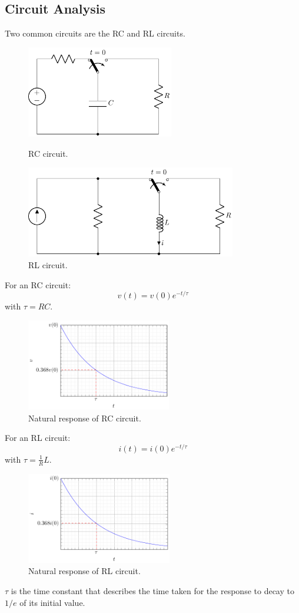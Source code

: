 \documentclass{article}
\begin{document}
\subsection{Circuit Analysis}
Two common circuits are the RC and RL circuits.
\begin{figure}[H]
    \centering
    \includegraphics[height = 4cm]{figures/rc_natural.pdf}
    \caption{RC circuit.} %
    \includegraphics[height = 4cm]{figures/rl_natural.pdf}
    \caption{RL circuit.} %
\end{figure}
For an RC circuit:
\begin{equation*}
    v\left( t \right) = v\left( 0 \right) e^{-t/\tau}
\end{equation*}
with \(\tau = RC\).
\begin{figure}[H]
    \centering
    \includegraphics[height = 4cm]{figures/rc_natural_plot.pdf}
    \caption{Natural response of RC circuit.} %
\end{figure}
For an RL circuit:
\begin{equation*}
    i\left( t \right) = i\left( 0 \right) e^{-t/\tau}
\end{equation*}
with \(\tau = \frac{1}{R}L\).
\begin{figure}[H]
    \centering
    \includegraphics[height = 4cm]{figures/rl_natural_plot.pdf}
    \caption{Natural response of RL circuit.} %
\end{figure}
\(\tau\) is the time constant that describes the time taken for the response to decay to \(1/e\) of its initial value.
\end{document}
